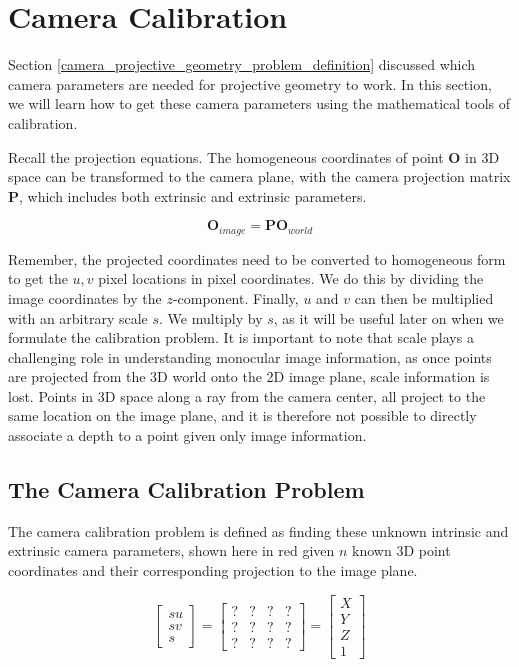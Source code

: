 \section{Camera Calibration}
\label{camera_calibration}

Section \ref{camera_projective_geometry_problem_definition} discussed which camera parameters are needed for projective
geometry to work. In this section, we will learn how to get these camera parameters using the mathematical tools
of calibration. 

Recall the projection equations. The homogeneous
coordinates of point $\mathbf{O}$ in 3D space can be transformed
to the camera plane, with the camera
projection matrix $\mathbf{P}$, which includes both extrinsic
and extrinsic parameters. 

\begin{equation}
\mathbf{O}_{image} = \mathbf{P}\mathbf{O}_{world}
\end{equation}

Remember, the projected coordinates need to be converted to homogeneous form
to get the $u,v$ pixel locations in pixel coordinates. 
We do this by dividing the image coordinates by the $z$-component. Finally, $u$ and $v$ can
then be multiplied with an arbitrary scale $s$. We multiply by $s$, as it will be useful
later on when we formulate the calibration problem. It is important to
note that scale plays a challenging role in understanding monocular
image information, as once points are projected from the 3D world onto
the 2D image plane, scale information is lost. Points in 3D space along
a ray from the camera center, all project to the same location
on the image plane, and it is therefore not
possible to directly associate a depth to a point given
only image information. 

\subsection{The Camera Calibration Problem}

The camera calibration problem is defined as finding these unknown intrinsic and
extrinsic camera parameters, shown here in red given $n$ known 3D point coordinates and
their corresponding projection to the image plane. 

\begin{equation}
\begin{bmatrix}
su \\
sv \\
s
\end{bmatrix} =
\begin{bmatrix}
? & ? & ? & ? \\
? & ? & ? & ? \\
? & ? & ? & ?
\end{bmatrix}=
\begin{bmatrix}
X \\
Y \\
Z  \\
1
\end{bmatrix}
\end{equation}

